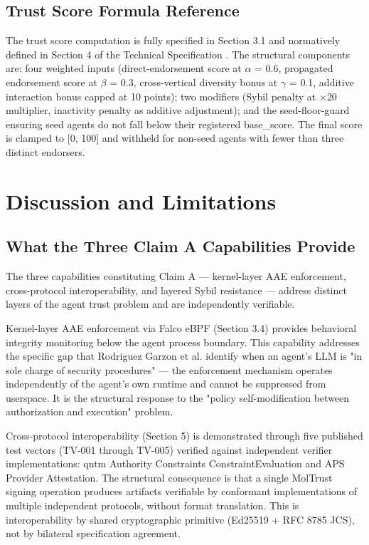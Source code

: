 \subsection{Trust Score Formula Reference}

The trust score computation is fully specified in Section 3.1 and normatively defined in Section 4 of the Technical Specification \cite{ref28_techspec}. The structural components are: four weighted inputs (direct-endorsement score at $\alpha$ = 0.6, propagated endorsement score at $\beta$ = 0.3, cross-vertical diversity bonus at $\gamma$ = 0.1, additive interaction bonus capped at 10 points); two modifiers (Sybil penalty at $\times$20 multiplier, inactivity penalty as additive adjustment); and the seed-floor-guard ensuring seed agents do not fall below their registered base\_score. The final score is clamped to [0, 100] and withheld for non-seed agents with fewer than three distinct endorsers.



\section{Discussion and Limitations}

\subsection{What the Three Claim A Capabilities Provide}

The three capabilities constituting Claim A — kernel-layer AAE enforcement, cross-protocol interoperability, and layered Sybil resistance — address distinct layers of the agent trust problem and are independently verifiable.


Kernel-layer AAE enforcement via Falco eBPF (Section 3.4) provides behavioral integrity monitoring below the agent process boundary. This capability addresses the specific gap that Rodriguez Garzon et al. \cite{ref36_rodriguezgarzon} identify when an agent's LLM is "in sole charge of security procedures" — the enforcement mechanism operates independently of the agent's own runtime and cannot be suppressed from userspace. It is the structural response to the "policy self-modification between authorization and execution" problem.


Cross-protocol interoperability (Section 5) is demonstrated through five published test vectors (TV-001 through TV-005) verified against independent verifier implementations: qntm Authority Constraints ConstraintEvaluation and APS Provider Attestation. The structural consequence is that a single MolTrust signing operation produces artifacts verifiable by conformant implementations of multiple independent protocols, without format translation. This is interoperability by shared cryptographic primitive (Ed25519 + RFC 8785 JCS), not by bilateral specification agreement.


